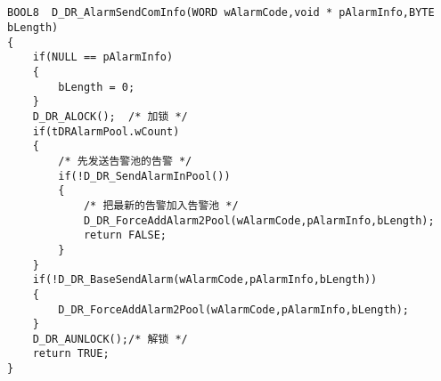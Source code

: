 ﻿\documentclass  [11pt,twocolumn]{article}
\begin{document}
\subsection{}
\begin{lstlisting}
BOOL8  D_DR_AlarmSendComInfo(WORD wAlarmCode,void * pAlarmInfo,BYTE bLength)
{
    if(NULL == pAlarmInfo)
    {
        bLength = 0;
    }
	D_DR_ALOCK();  /* 加锁 */
	if(tDRAlarmPool.wCount)
	{
        /* 先发送告警池的告警 */
		if(!D_DR_SendAlarmInPool())
		{
		    /* 把最新的告警加入告警池 */
			D_DR_ForceAddAlarm2Pool(wAlarmCode,pAlarmInfo,bLength);
		    return FALSE;
	    }
    }
    if(!D_DR_BaseSendAlarm(wAlarmCode,pAlarmInfo,bLength))
    {
        D_DR_ForceAddAlarm2Pool(wAlarmCode,pAlarmInfo,bLength);
    }
    D_DR_AUNLOCK();/* 解锁 */
    return TRUE;
}
\end{lstlisting}
\end{document}
